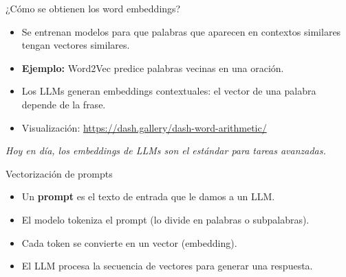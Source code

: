 \documentclass[aspectratio=169,xcolor=dvipsnames, t]{beamer}
\begin{document}
\begin{frame}{¿Cómo se obtienen los word embeddings?}
    \begin{itemize}
        \item Se entrenan modelos para que palabras que aparecen en contextos similares tengan vectores similares.
        \item \textbf{Ejemplo:} Word2Vec predice palabras vecinas en una oración.
        \item Los LLMs generan embeddings contextuales: el vector de una palabra depende de la frase.
        \item Visualización: \href{https://dash.gallery/dash-word-arithmetic/}{https://dash.gallery/dash-word-arithmetic/}

    \end{itemize}
    \vspace{0.2cm}
    \textit{Hoy en día, los embeddings de LLMs son el estándar para tareas avanzadas.}
\end{frame}

\begin{frame}{Vectorización de prompts}
    \begin{itemize}
        \item Un \textbf{prompt} es el texto de entrada que le damos a un LLM.
        \item El modelo tokeniza el prompt (lo divide en palabras o subpalabras).
        \item Cada token se convierte en un vector (embedding).
        \item El LLM procesa la secuencia de vectores para generar una respuesta.
    \end{itemize}
    \vspace{0.3cm}
    
\end{frame}

\end{document}
